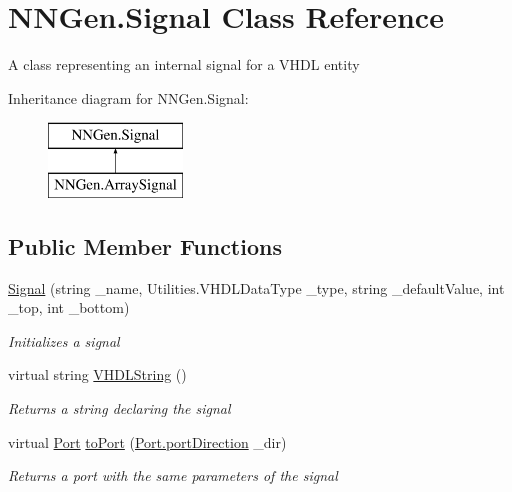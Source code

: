 \hypertarget{class_n_n_gen_1_1_signal}{}\section{N\+N\+Gen.\+Signal Class Reference}
\label{class_n_n_gen_1_1_signal}


A class representing an internal signal for a V\+H\+D\+L entity  


Inheritance diagram for N\+N\+Gen.\+Signal\+:\begin{figure}[H]
\begin{center}
\leavevmode
\includegraphics[height=2.000000cm]{class_n_n_gen_1_1_signal}
\end{center}
\end{figure}
\subsection*{Public Member Functions}
\begin{DoxyCompactItemize}
\item 
\hyperlink{class_n_n_gen_1_1_signal_a8e17b61cd22e4d1492b42f93f0f066f9}{Signal} (string \+\_\+name, Utilities.\+V\+H\+D\+L\+Data\+Type \+\_\+type, string \+\_\+default\+Value, int \+\_\+top, int \+\_\+bottom)
\begin{DoxyCompactList}\small\item\em Initializes a signal \end{DoxyCompactList}\item 
virtual string \hyperlink{class_n_n_gen_1_1_signal_a35818f3d3a0c4c567701300d90c846ff}{V\+H\+D\+L\+String} ()
\begin{DoxyCompactList}\small\item\em Returns a string declaring the signal \end{DoxyCompactList}\item 
virtual \hyperlink{class_n_n_gen_1_1_port}{Port} \hyperlink{class_n_n_gen_1_1_signal_a15f668236a819dab4054232fc8e82895}{to\+Port} (\hyperlink{class_n_n_gen_1_1_port_ac3b8f11a7a6bd6872e6954b64721d90c}{Port.\+port\+Direction} \+\_\+dir)
\begin{DoxyCompactList}\small\item\em Returns a port with the same parameters of the signal \end{DoxyCompactList}\end{DoxyCompactItemize}
